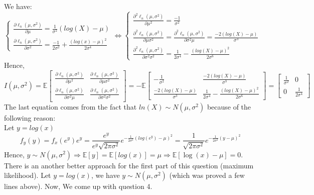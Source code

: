 \documentclass[10pt]{article}
\newenvironment{problem}[2][Problem]{\begin{trivlist}
\item[\hskip \labelsep {\bfseries #1}\hskip \labelsep {\bfseries #2.}]}{\end{trivlist}}
\begin{document}
\begin{problem}{1}
We have: 
\[ \begin{cases} \frac{\partial \ell_n(\mu, \sigma^2)}{\partial \mu} = \frac{1}{\sigma^2}(log(X) - \mu) \\\frac{\partial \ell_n(\mu, \sigma^2)}{\partial \sigma^2} = \frac{-1}{2\sigma^2} + \frac{(log(x)-\mu)^2}{2\sigma^4} \end{cases} \Leftrightarrow \begin{cases} \frac{\partial^2  \ell_n(\mu, \sigma^2)}{\partial \mu^2} = \frac{-1}{\sigma^2} \\ \frac{\partial^2  \ell_n(\mu, \sigma^2)}{\partial \mu \sigma^2}= \frac{\partial^2  \ell_n(\mu, \sigma^2)}{\partial \sigma^2 \mu}= \frac{-2(log(X)-\mu)}{\sigma^3} \\  \frac{\partial^2  \ell_n(\mu, \sigma^2)}{\partial \sigma^2 \sigma^2} = \frac{1}{2\sigma^4} - \frac{(log(X)-\mu)^2}{2\sigma^6} \end{cases}\]
Hence, 
\[ I(\mu, \sigma^2)=\mathbb{E} \begin{bmatrix}
    \frac{\partial \ell_n(\mu, \sigma^2)}{\partial \mu^2} & \frac{\partial \ell_n(\mu, \sigma^2)}{\partial \mu \sigma^2}\\
    \frac{\partial \ell_n(\mu, \sigma^2)}{\partial \sigma^2 \mu} & \frac{\partial \ell_n(\mu, \sigma^2)}{\partial \sigma^2 \sigma^2}
\end{bmatrix} = -\mathbb{E} \begin{bmatrix}
    -\frac{1}{\sigma^2} & \frac{-2(log(X)-\mu)}{\sigma^3} \\
    \frac{-2(log(X)-\mu)}{\sigma^3} & \frac{1}{2\sigma^4} - \frac{(log(X)-\mu)^2}{2\sigma^6}
\end{bmatrix}= \begin{bmatrix}
\frac{1}{\sigma^2} & 0 \\
0 & \frac{1}{2\sigma^4}
\end{bmatrix} \]
The last equation comes from the fact that $ln(X) \sim N(\mu, \sigma^2)$ because of the following reason:\\
Let $y=log(x)$ 
\[ f_{y}(y)=f_{x}(e^y)e^{y}=\frac{e^{y}}{e^{y}\sqrt{2\pi \sigma^2}} e^{-\frac{1}{2\sigma^2}(log(e^y)-\mu)^2}=\frac{1}{\sqrt{2\pi \sigma^2}}e^{-\frac{1}{2\sigma^2}(y-\mu)^2} \]
Hence, $y \sim N(\mu, \sigma^2) \Longrightarrow \mathbb{E}[y]=\mathbb{E}[log(x)]=\mu \Longrightarrow \mathbb{E}[\log(x) -\mu] = 0$.
There is an another better approach for the first part of this question (maximum likelihood). Let $y=log(x)$, we have $y\sim N(\mu, \sigma^2)$ (which was proved a few lines above). Now, We come up with question 4.\\












\end{problem}

\begin{problem}{2}


\end{problem}
\end{document}
